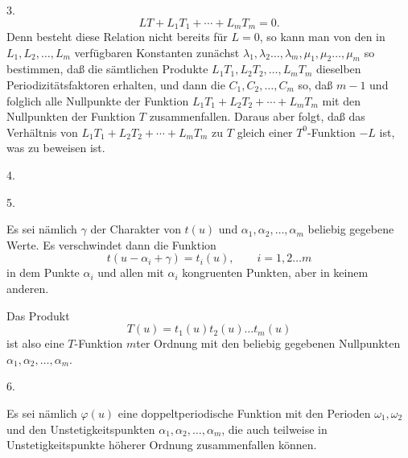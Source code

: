 3. 
\[
LT + L_1T_1 + \cdots + L_mT_m = 0.
\]
Denn besteht diese Relation nicht bereits für $L=0$, so kann man von den in $L_1, L_2, \ldots, L_m$ verfügbaren Konstanten zunächst $\lambda_1, \lambda_2 \ldots, \lambda_m, \mu_1, \mu_2 \ldots, \mu_m$ so bestimmen, daß die sämtlichen Produkte $L_1T_1, L_2T_2, \ldots, L_mT_m$ dieselben Periodizitätsfaktoren erhalten, und dann die $C_1, C_2, \ldots, C_m$ so, daß $m-1$ und folglich alle Nullpunkte der Funktion $L_1T_1+L_2T_2+\cdots+L_mT_m$ mit den Nullpunkten der Funktion $T$ zusammenfallen. Daraus aber folgt, daß das Verhältnis von $L_1T_1+L_2T_2+\cdots+L_mT_m$ zu $T$ gleich einer $T^0$-Funktion $-L$ ist, was zu beweisen ist.

4. 

5. 

Es sei nämlich $\gamma$ der Charakter von $t(u)$ und $\alpha_1, \alpha_2, \ldots, \alpha_m$ beliebig gegebene Werte. Es verschwindet dann die Funktion
\[
t(u-\alpha_i+\gamma) = t_i(u), \qquad i = 1, 2 \ldots m
\]
in dem Punkte $\alpha_i$ und allen mit $\alpha_i$ kongruenten Punkten, aber in keinem anderen.

Das Produkt
\[
T(u) = t_1(u)t_2(u) \ldots t_m(u)
\]
ist also eine $T$-Funktion $m$ter Ordnung mit den beliebig gegebenen Nullpunkten $\alpha_1, \alpha_2, \ldots, \alpha_m$.

6. 

Es sei nämlich $\varphi(u)$ eine doppeltperiodische Funktion mit den Perioden $\omega_1, \omega_2$ und den Unstetigkeitspunkten $\alpha_1, \alpha_2, \ldots, \alpha_m$, die auch teilweise in Unstetigkeitspunkte höherer Ordnung zusammenfallen können.
